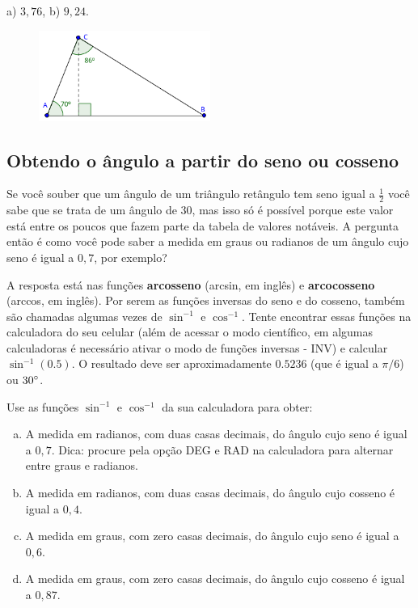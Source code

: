 \documentclass[main.tex]{subfiles}
\begin{document}
\begin{gabarito}
	\begin{gabaritoQuestao}
		a) $3,76$, b) $9,24$.
	\end{gabaritoQuestao}
\end{gabarito}


\begin{figure}[h]
\centering
\includegraphics[width=0.5\textwidth]{./img/c4q3.png}
\end{figure}

\subsection*{Obtendo o ângulo a partir do seno ou cosseno}

Se você souber que um ângulo de um triângulo retângulo tem seno igual a $\frac{1}{2}$ você sabe que se trata de um ângulo de 30\degree, mas isso só é possível porque este valor está entre os poucos que fazem parte da tabela de valores notáveis. A pergunta então é como você pode saber a medida em graus ou radianos de um ângulo cujo seno é igual a $0,7$, por exemplo?

A resposta está nas funções \textbf{arcosseno} (arcsin, em inglês) e \textbf{arcocosseno} (arccos, em inglês). Por serem as funções inversas do seno e do cosseno, também são chamadas algumas vezes de $\sin^{-1}$ e $\cos^{-1}$. Tente encontrar essas funções na calculadora do seu celular (além de acessar o modo científico, em algumas calculadoras é necessário ativar o modo de funções inversas - INV) e calcular $\sin^{-1}(0.5)$. O resultado deve ser aproximadamente $0.5236$ (que é igual a $\pi/6$) ou $30\degree$.

\begin{questao}
Use as funções $\sin^{-1}$ e $\cos^{-1}$ da sua calculadora para obter:
\begin{enumerate}[a)]
\item A medida em radianos, com duas casas decimais, do ângulo cujo seno é igual a $0,7$. Dica: procure pela opção DEG e RAD na calculadora para alternar entre graus e radianos.
\item A medida em radianos, com duas casas decimais, do ângulo cujo cosseno é igual a $0,4$.
\item A medida em graus, com zero casas decimais, do ângulo cujo seno é igual a $0,6$. 
\item A medida em graus, com zero casas decimais, do ângulo cujo cosseno é igual a $0,87$.
\end{enumerate}
\end{questao}
\end{document}
